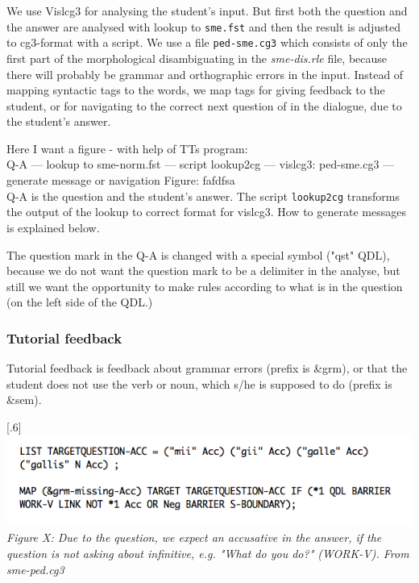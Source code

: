 \documentclass[a4paper,12pt]{article}
\begin{document}
We use Vislcg3 for analysing the student's input. But first both the question and the answer are analysed with lookup to \texttt{sme.fst} and then the result is adjusted to cg3-format with a script. We use a file \texttt{ped-sme.cg3} which consists of only the first part of the morphological disambiguating in the \textit{sme-dis.rle} file, because there will probably be grammar and orthographic errors in the input. Instead of mapping syntactic tags to the words, we map tags for giving feedback to the student, or for navigating to the correct next question of in the dialogue, due to the student's answer.

Here I want a figure - with help of TTs program:\\
Q-A --- lookup to sme-norm.fst --- script lookup2cg --- vislcg3: ped-sme.cg3 --- generate message or navigation
Figure: fafdfsa\\

Q-A is the question and the student's answer. The script \texttt{lookup2cg} transforms the output of the lookup to correct format for vislcg3. How to generate messages is explained below.

The question mark in the Q-A is changed with a special symbol ("qst" QDL), because we do not want the question mark to be a delimiter in the analyse, but still we want the opportunity to make rules according to what is in the question (on the left side of the QDL.)


\subsubsection{Tutorial feedback}
Tutorial feedback is feedback about grammar errors (prefix is \&grm), or that the student does not use the verb or noun, which s/he is supposed to do (prefix is \&sem). 

\scalebox{.6}[.6]{\includegraphics{img/pedcg3.png}}
\\
\textit{Figure X: Due to the question, we expect an accusative in the answer, if the question is not asking about infinitive, e.g. "What do you do?" (WORK-V). From sme-ped.cg3}\\
\end{document}
